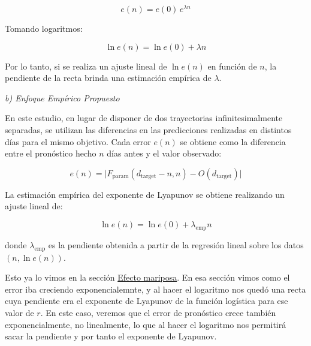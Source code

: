 \documentclass[
  10pt,
  a4paper,
  DIV=11,
  numbers=noendperiod,
  open=any]{scrreprt}
\numberwithin{equation}{chapter}
\numberwithin{equation}{chapter}
\renewcommand{\[}{\begin{equation}}
\renewcommand{\]}{\end{equation}}
\begin{document}
\begin{equation}

e(n) = e(0)\, e^{\lambda n}

\end{equation}

Tomando logaritmos:

\begin{equation}

\ln e(n) = \ln e(0) + \lambda n

\end{equation}

Por lo tanto, si se realiza un ajuste lineal de \(\ln e(n)\) en función
de \(n\), la pendiente de la recta brinda una estimación empírica de
\(\lambda\).

\emph{b) Enfoque Empírico Propuesto}

En este estudio, en lugar de disponer de dos trayectorias
infinitesimalmente separadas, se utilizan las diferencias en las
predicciones realizadas en distintos días para el mismo objetivo. Cada
error \(e(n)\) se obtiene como la diferencia entre el pronóstico hecho
\(n\) días antes y el valor observado:

\begin{equation}

e(n) = \bigl| F_{\text{param}}(d_{\text{target}}-n, n) - O(d_{\text{target}}) \bigr|

\end{equation}

La estimación empírica del exponente de Lyapunov se obtiene realizando
un ajuste lineal de:

\begin{equation}

\ln e(n) = \ln e(0) + \lambda_{\text{emp}} n

\end{equation}

donde \(\lambda_{\text{emp}}\) es la pendiente obtenida a partir de la
regresión lineal sobre los datos \((n, \ln e(n))\).

Esto ya lo vimos en la sección \hyperref[sec-sensibilidad]{Efecto
mariposa}. En esa sección vimos como el error iba creciendo
exponencialemnte, y al hacer el logaritmo nos quedó una recta cuya
pendiente era el exponente de Lyapunov de la función logística para ese
valor de \(r\). En este caso, veremos que el error de pronóstico crece
también exponencialmente, no linealmente, lo que al hacer el logaritmo
nos permitirá sacar la pendiente y por tanto el exponente de Lyapunov.
\end{document}
